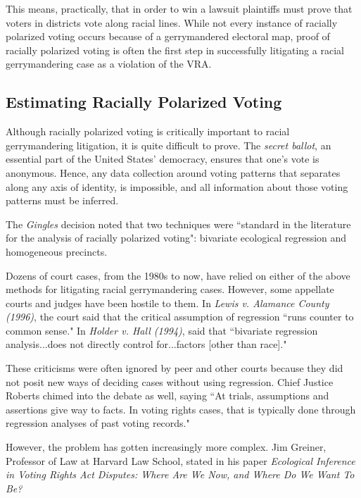 This means, practically, that in order to win a lawsuit plaintiffs must prove that voters in districts vote along racial lines. While not every instance of racially polarized voting occurs because of a gerrymandered electoral map, proof of racially polarized voting is often the first step in successfully litigating a racial gerrymandering case as a violation of the VRA.

\subsection{Estimating Racially Polarized Voting}

Although racially polarized voting is critically important to racial gerrymandering litigation, it is quite difficult to prove. The \textit{secret ballot}, an essential part of the United States' democracy, ensures that one's vote is anonymous. Hence, any data collection around voting patterns that separates along any axis of identity, is impossible, and all information about those voting patterns must be inferred.

The \textit{Gingles} decision noted that two techniques were ``standard in the literature for the analysis of racially polarized voting"\cite{thornburg}: bivariate ecological regression and homogeneous precincts.

Dozens of court cases, from the 1980s to now, have relied on either of the above methods for litigating racial gerrymandering cases\cite{greiner}. However, some appellate courts and judges have been hostile to them. In \textit{Lewis v. Alamance County (1996)}\cite{Lewis_Alamance}, the court said that the critical assumption of regression ``runs counter to common sense." In \textit{Holder v. Hall (1994)}\cite{Holder_Hall}, said that ``bivariate regression analysis...does not directly control for...factors [other than race]."

These criticisms were often ignored by peer and other courts because they did not posit new ways of deciding cases without using regression. Chief Justice Roberts chimed into the debate as well, saying ``At trials, assumptions and assertions give way to facts. In voting rights cases, that is typically done through regression analyses of past voting records."\cite{LULAC}

However, the problem has gotten increasingly more complex. Jim Greiner, Professor of Law at Harvard Law School, stated in his paper \textit{Ecological Inference in Voting Rights Act Disputes: Where Are We Now, and Where Do We Want To Be?}\cite{greiner}

